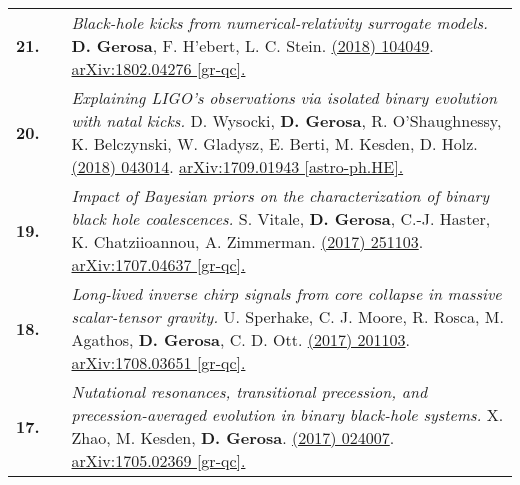 {\begin{longtable}{rp{0.3cm}p{15.8cm}}
%
\textbf{21.} & & \textit{Black-hole kicks from numerical-relativity surrogate models.}
\newline{}
\textbf{D. Gerosa}, F. H'ebert, L. C. Stein.
\newline{}
\href{https://journals.aps.org/prd/abstract/10.1103/PhysRevD.97.104049}{\prd 97 (2018) 104049}. \href{https://arxiv.org/abs/1802.04276}{arXiv:1802.04276 [gr-qc].}
\vspace{0.09cm}\\
%
\textbf{20.} & & \textit{Explaining LIGO's observations via isolated binary evolution with natal kicks.}
\newline{}
D. Wysocki, \textbf{D. Gerosa}, R. O'Shaughnessy, K. Belczynski, W. Gladysz, E. Berti, M. Kesden, D. Holz.
\newline{}
\href{https://journals.aps.org/prd/abstract/10.1103/PhysRevD.97.043014}{\prd 97 (2018) 043014}. \href{https://arxiv.org/abs/1709.01943}{arXiv:1709.01943 [astro-ph.HE].}
\vspace{0.09cm}\\
%
\textbf{19.} & & \textit{Impact of Bayesian priors on the characterization of binary black hole coalescences.}
\newline{}
S. Vitale, \textbf{D. Gerosa}, C.-J. Haster, K. Chatziioannou, A. Zimmerman.
\newline{}
\href{http://dx.doi.org/10.1103/PhysRevLett.119.251103}{\prl 119 (2017) 251103}. \href{https://arxiv.org/abs/1707.04637}{arXiv:1707.04637 [gr-qc].}
\vspace{0.09cm}\\
%
\textbf{18.} & & \textit{Long-lived inverse chirp signals from core collapse in massive scalar-tensor gravity.}
\newline{}
U. Sperhake, C. J. Moore, R. Rosca, M. Agathos, \textbf{D. Gerosa}, C. D. Ott.
\newline{}
\href{http://dx.doi.org/10.1103/PhysRevLett.119.201103}{\prl 119 (2017) 201103}. \href{https://arxiv.org/abs/1708.03651}{arXiv:1708.03651 [gr-qc].}
\vspace{0.09cm}\\
%
\textbf{17.} & & \textit{Nutational resonances, transitional precession, and precession-averaged evolution in binary black-hole systems.}
\newline{}
X. Zhao, M. Kesden, \textbf{D. Gerosa}.
\newline{}
\href{http://dx.doi.org/10.1103/PhysRevD.96.024007}{\prd 96 (2017) 024007}. \href{https://arxiv.org/abs/1705.02369}{arXiv:1705.02369 [gr-qc].}
\vspace{0.09cm}\\

\end{longtable}}
